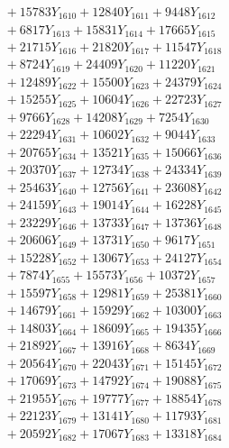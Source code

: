 \documentclass[a4paper,10pt]{article}
\begin{document}
{\begin{align}
&\;  + 15783 Y_{1610} + 12840 Y_{1611} + 9448 Y_{1612} \\[0.3ex]
&\;  + 6817 Y_{1613} + 15831 Y_{1614} + 17665 Y_{1615} \\[0.3ex]
&\;  + 21715 Y_{1616} + 21820 Y_{1617} + 11547 Y_{1618} \\[0.5ex]\allowbreak
&\;  + 8724 Y_{1619} + 24409 Y_{1620} + 11220 Y_{1621} \\[0.3ex]
&\;  + 12489 Y_{1622} + 15500 Y_{1623} + 24379 Y_{1624} \\[0.3ex]
&\;  + 15255 Y_{1625} + 10604 Y_{1626} + 22723 Y_{1627} \\[0.3ex]
&\;  + 9766 Y_{1628} + 14208 Y_{1629} + 7254 Y_{1630} \\[0.3ex]
&\;  + 22294 Y_{1631} + 10602 Y_{1632} + 9044 Y_{1633} \\[0.3ex]
&\;  + 20765 Y_{1634} + 13521 Y_{1635} + 15066 Y_{1636} \\[0.3ex]
&\;  + 20370 Y_{1637} + 12734 Y_{1638} + 24334 Y_{1639} \\[0.3ex]
&\;  + 25463 Y_{1640} + 12756 Y_{1641} + 23608 Y_{1642} \\[0.3ex]
&\;  + 24159 Y_{1643} + 19014 Y_{1644} + 16228 Y_{1645} \\[0.3ex]
&\;  + 23229 Y_{1646} + 13733 Y_{1647} + 13736 Y_{1648} \\[0.5ex]\allowbreak
&\;  + 20606 Y_{1649} + 13731 Y_{1650} + 9617 Y_{1651} \\[0.3ex]
&\;  + 15228 Y_{1652} + 13067 Y_{1653} + 24127 Y_{1654} \\[0.3ex]
&\;  + 7874 Y_{1655} + 15573 Y_{1656} + 10372 Y_{1657} \\[0.3ex]
&\;  + 15597 Y_{1658} + 12981 Y_{1659} + 25381 Y_{1660} \\[0.3ex]
&\;  + 14679 Y_{1661} + 15929 Y_{1662} + 10300 Y_{1663} \\[0.3ex]
&\;  + 14803 Y_{1664} + 18609 Y_{1665} + 19435 Y_{1666} \\[0.3ex]
&\;  + 21892 Y_{1667} + 13916 Y_{1668} + 8634 Y_{1669} \\[0.3ex]
&\;  + 20564 Y_{1670} + 22043 Y_{1671} + 15145 Y_{1672} \\[0.3ex]
&\;  + 17069 Y_{1673} + 14792 Y_{1674} + 19088 Y_{1675} \\[0.3ex]
&\;  + 21955 Y_{1676} + 19777 Y_{1677} + 18854 Y_{1678} \\[0.5ex]\allowbreak
&\;  + 22123 Y_{1679} + 13141 Y_{1680} + 11793 Y_{1681} \\[0.3ex]
&\;  + 20592 Y_{1682} + 17067 Y_{1683} + 13318 Y_{1684} \\[0.3ex]

\end{align}}
\end{document}
